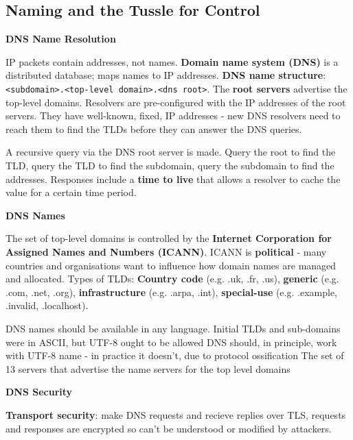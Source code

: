 \documentclass{article}
\begin{document}
\clearpage

\subsection*{Naming and the Tussle for Control}

\vspace{\baselineskip}
\textbf{DNS Name Resolution}

IP packets contain addresses, not names.
\textbf{Domain name system (DNS)} is a distributed database; maps names to IP addresses.
\textbf{DNS name structure}: \texttt{<subdomain>.<top-level domain>.<dns root>}.
The \textbf{root servers} advertise the top-level domains.
Resolvers are pre-configured with the IP addresses of the root servers.
They have well-known, fixed, IP addresses {-} new DNS resolvers need to reach them to find the TLDs before they can answer the DNS queries.

A recursive query via the DNS root server is made. Query the root to find the TLD, query the TLD to find the subdomain,
query the subdomain to find the addresses.
Responses include a \textbf{time to live} that allows a resolver to cache the value for a certain time period.

\vspace{\baselineskip}
\textbf{DNS Names}

The set of top-level domains is controlled by the \textbf{Internet Corporation for Assigned Names and Numbers (ICANN)}.
ICANN is \textbf{political} {-} many countries and organisations want to influence how domain names are managed and allocated.
Types of TLDs:
\textbf{Country code} (e.g. {.}uk, {.}fr, {.}us),
\textbf{generic} (e.g. {.}com, {.}net, {.}org),
\textbf{infrastructure} (e.g. {.}arpa, {.}int),
\textbf{special-use} (e.g. {.}example, {.}invalid, {.}localhost).

DNS names should be available in any language. Initial TLDs and sub-domains were in ASCII, but UTF-8 ought to be allowed
DNS should, in principle, work with UTF-8 name {-} in practice it doesn't, due to protocol ossification
The set of 13 servers that advertise the name servers for the top level domains

\vspace{\baselineskip}
\textbf{DNS Security}

\textbf{Transport security}: make DNS requests and recieve replies over TLS, requests and responses are encrypted so can't be understood or modified by attackers.
\end{document}
